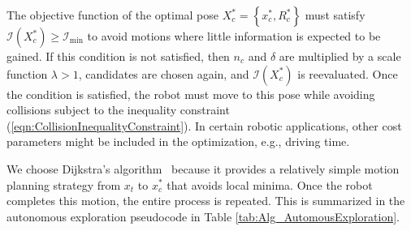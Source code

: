 \documentclass[letterpaper, 10pt, conference]{ieeeconf}
\newcommand{\norm}[1]{\ensuremath{\left\| #1 \right\|}}
\newcommand{\braces}[1]{\ensuremath{\left\{ #1 \right\}}}
\newcommand{\refeqn}[1]{(\ref{eqn:#1})}
\renewcommand{\Re}{\ensuremath{\mathbb{R}}}
\begin{document}
%
%
%

The objective function of the optimal pose $X_c^*=\braces{x_c^*,R_c^*}$ must satisfy $\mathcal I(X_c^*)\geq\mathcal I_\text{min}$ to avoid motions where little information is expected to be gained. 
If this condition is not satisfied, then $n_c$ and $\delta$ are multiplied by a scale function $\lambda>1$, candidates are chosen again, and $\mathcal I(X_c^*)$ is reevaluated.
Once the condition is satisfied, the robot must move to this pose while avoiding collisions subject to the inequality constraint \refeqn{CollisionInequalityConstraint}. In certain robotic applications, other cost parameters might be included in the optimization, e.g., driving time.

We choose Dijkstra's algorithm~\cite{Dij59} because it provides a relatively simple motion planning strategy from $x_t$ to $x_c^*$ that avoids local minima. Once the robot completes this motion, the entire process is repeated. This is summarized in the autonomous exploration pseudocode in Table \ref{tab:Alg_AutomousExploration}.


\end{document}
